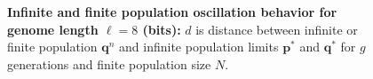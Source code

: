 \begin{figure}[H]
\begin{center}
{}


\caption{\textbf{Infinite and finite population oscillation behavior for genome length $\ell = 8$ (bits):} $d$ is
  distance between infinite or finite population ${\bm q}^n$ and infinite
  population limits ${{\bm p}^\ast}$ and ${{\bm q}^{\ast}}$ for $g$ generations and finite population size $N$.}
\label{oscillation_8}
\end{center}
\end{figure}

